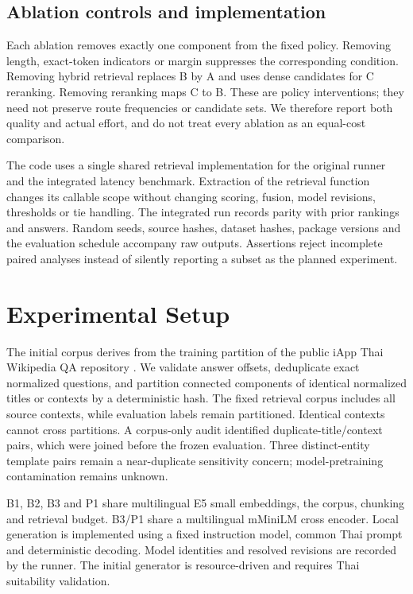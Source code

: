 \documentclass[10pt,a4paper]{article}
\begin{document}
\hypertarget{ablation-controls-and-implementation}{%
\subsection{Ablation controls and
implementation}\label{ablation-controls-and-implementation}}

Each ablation removes exactly one component from the fixed policy.
Removing length, exact-token indicators or margin suppresses the
corresponding condition. Removing hybrid retrieval replaces B by A and
uses dense candidates for C reranking. Removing reranking maps C to B.
These are policy interventions; they need not preserve route frequencies
or candidate sets. We therefore report both quality and actual effort,
and do not treat every ablation as an equal-cost comparison.

The code uses a single shared retrieval implementation for the original
runner and the integrated latency benchmark. Extraction of the retrieval
function changes its callable scope without changing scoring, fusion,
model revisions, thresholds or tie handling. The integrated run records
parity with prior rankings and answers. Random seeds, source hashes,
dataset hashes, package versions and the evaluation schedule accompany
raw outputs. Assertions reject incomplete paired analyses instead of
silently reporting a subset as the planned experiment.

\hypertarget{experimental-setup}{%
\section{Experimental Setup}\label{experimental-setup}}

The initial corpus derives from the training partition of the public
iApp Thai Wikipedia QA repository \citep{ref17}. We validate answer
offsets, deduplicate exact normalized questions, and partition connected
components of identical normalized titles or contexts by a deterministic
hash. The fixed retrieval corpus includes all source contexts, while
evaluation labels remain partitioned. Identical contexts cannot cross
partitions. A corpus-only audit identified duplicate-title/context
pairs, which were joined before the frozen evaluation. Three
distinct-entity template pairs remain a near-duplicate sensitivity
concern; model-pretraining contamination remains unknown.

B1, B2, B3 and P1 share multilingual E5 small embeddings, the corpus,
chunking and retrieval budget. B3/P1 share a multilingual mMiniLM cross
encoder. Local generation is implemented using a fixed instruction
model, common Thai prompt and deterministic decoding. Model identities
and resolved revisions are recorded by the runner. The initial generator
is resource-driven and requires Thai suitability validation.
\end{document}

